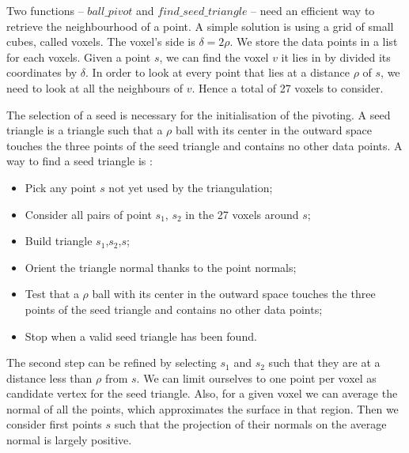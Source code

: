 \documentclass[a4paper]{article}
\begin{document}
Two functions -- $ball\_pivot$ and $find\_seed\_triangle$ -- need an efficient way to retrieve the neighbourhood of a point. A simple solution is using a grid of small cubes, called voxels. The voxel's side is $\delta = 2\rho$. We store the data points in a list for each voxels. Given a point $s$, we can find the voxel $v$ it lies in by divided its coordinates by $\delta$. In order to look at every point that lies at a distance $\rho$ of $s$, we need to look at all the neighbours of $v$. Hence a total of 27 voxels to consider.

The selection of a seed is necessary for the initialisation of the pivoting. A seed triangle is a triangle such that a $\rho$ ball with its center in the outward space touches the three points of the seed triangle and contains no other data points. A way to find a seed triangle is :
\begin{itemize}
\item Pick any point $s$ not yet used by the triangulation;
\item Consider all pairs of point $s_1$, $s_2$ in the 27 voxels around $s$;
\item Build triangle $s_1$,$s_2$,$s$;
\item Orient the triangle normal thanks to the point normals;
\item Test that a $\rho$ ball with its center in the outward space touches the three points of the seed triangle and contains no other data points;
\item Stop when a valid seed triangle has been found.
\end{itemize}

The second step can be refined by selecting $s_1$ and $s_2$ such that they are at a distance less than $\rho$ from $s$. We can limit ourselves to one point per voxel as candidate vertex for the seed triangle. Also, for a given voxel we can average the normal of all the points, which approximates the surface in that region. Then we consider first points $s$ such that the projection of their normals on the average normal is largely positive.
\end{document}
